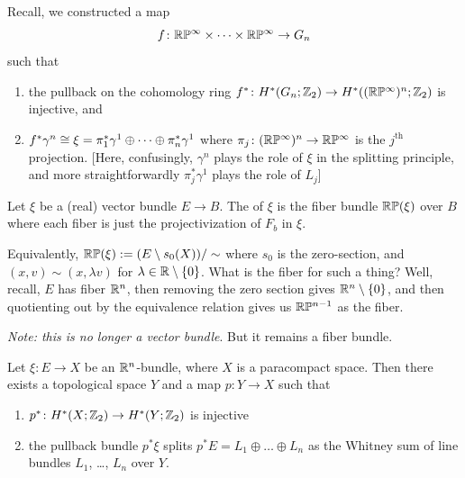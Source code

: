 \begin{example}
Recall, we constructed a map
\begin{equation}
f\colon\mathbb{R}\mathbb{P}^{\infty}\times\dots\times\mathbb{R}\mathbb{P}^{\infty}\to G_{n}
\end{equation}
such that
\begin{enumerate}
\item the pullback on the cohomology ring $f^{*}\colon H^{*}(G_{n};\mathbb{Z}_{2})\to H^{*}((\mathbb{R}\mathbb{P}^{\infty})^{n};\mathbb{Z}_{2})$
is injective, and
\item $f^{*}\gamma^{n}\cong\xi=\pi_{1}^{*}\gamma^{1}\oplus\dots\oplus\pi_{n}^{*}\gamma^{1}$
where $\pi_{j}\colon(\mathbb{R}\mathbb{P}^{\infty})^{n}\to\mathbb{R}\mathbb{P}^{\infty}$ is the
$j^{\text{th}}$ projection. [Here, confusingly, $\gamma^{n}$ plays the
  role of $\xi$ in the splitting principle, and more straightforwardly
  $\pi_{j}^{*}\gamma^{1}$ plays the role of $L_{j}$]
\end{enumerate}
\end{example}

\begin{definition}
Let $\xi$ be a (real) vector bundle $E\to B$.
The  of $\xi$ is the fiber bundle
$\mathbb{R}\mathbb{P}(\xi)$ over $B$ where each fiber is just the
projectivization of $F_{b}$ in $\xi$.

Equivalently, $\mathbb{R}\mathbb{P}(\xi):=(E\setminus s_{0}(X))/\sim$
where $s_{0}$ is the zero-section, and $(x,v)\sim(x,\lambda v)$ for
$\lambda\in\mathbb{R}\setminus\{0\}$. What is the fiber for such a thing?
Well, recall, $E$ has fiber $\mathbb{R}^{n}$, then removing the zero section
gives $\mathbb{R}^{n}\setminus\{0\}$, and then quotienting out by the
equivalence relation gives us $\mathbb{R}\mathbb{P}^{n-1}$ as the fiber.

\emph{Note: this is no longer a vector bundle}. But it remains a fiber bundle.
\end{definition}



\begin{theorem}
Let $\xi\colon E\to X$ be an $\mathbb{R}^{n}$-bundle, where $X$ is a
paracompact space. Then there exists a topological space $Y$ and a map
$p\colon Y\to X$ such that
\begin{enumerate}
\item $p^{*}\colon H^{*}(X;\mathbb{Z}_{2})\to H^{*}(Y;\mathbb{Z}_{2})$ is injective
\item the pullback bundle $p^{*}\xi$ splits
  $p^{*}E=L_{1}\oplus\dots\oplus L_{n}$ as the Whitney sum of line
  bundles $L_{1}$, \dots, $L_{n}$ over $Y$.
\end{enumerate}
\end{theorem}

